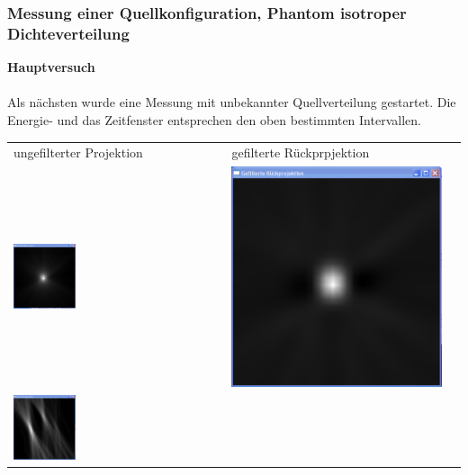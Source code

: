         \subsubsection{Messung einer Quellkonfiguration, Phantom isotroper Dichteverteilung}
          \textbf{Hauptversuch}\\
             \ \\
          Als nächsten wurde eine Messung mit unbekannter Quellverteilung gestartet. Die Energie- und das Zeitfenster entsprechen den oben bestimmten Intervallen.
          \minipanf  
            \begin{center}
            \begin{tabular}{p{7cm}p{7cm}c}
                ungefilterter Projektion & gefilterte Rückprpjektion\\
                \includegraphics[width=0.3\textwidth, height=0.2\textheight]{pic/Einzelfenster_Bilder/unbekannte_Quelle/unbek1_einf_prj.png}
                & 
                \includegraphics[width=.3\textwidth, height=0.2\textheight]{pic/Einzelfenster_Bilder/unbekannte_Quelle/unbek1gef_prj.png}\\
                \includegraphics[width=0.3\textwidth, height=0.2\textheight]{pic/Einzelfenster_Bilder/unbekannte_Quelle/unbek2einf_prj.png}

\end{tabular}
\end{center}
